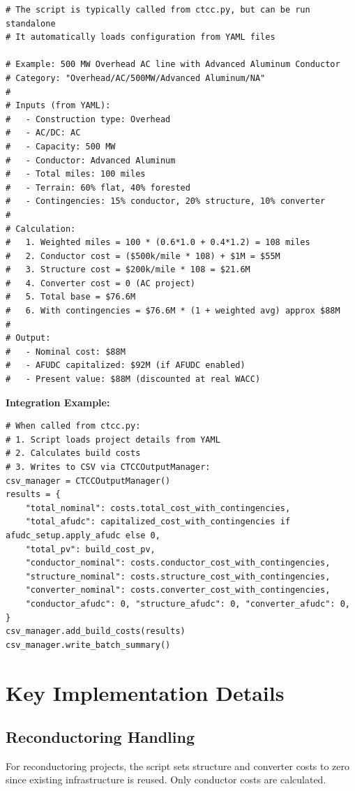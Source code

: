 \documentclass[ctcc_full_documentation.tex]{subfiles}
\begin{document}
\begin{lstlisting}
# The script is typically called from ctcc.py, but can be run standalone
# It automatically loads configuration from YAML files

# Example: 500 MW Overhead AC line with Advanced Aluminum Conductor
# Category: "Overhead/AC/500MW/Advanced Aluminum/NA"
# 
# Inputs (from YAML):
#   - Construction type: Overhead
#   - AC/DC: AC
#   - Capacity: 500 MW
#   - Conductor: Advanced Aluminum
#   - Total miles: 100 miles
#   - Terrain: 60% flat, 40% forested
#   - Contingencies: 15% conductor, 20% structure, 10% converter
#
# Calculation:
#   1. Weighted miles = 100 * (0.6*1.0 + 0.4*1.2) = 108 miles
#   2. Conductor cost = ($500k/mile * 108) + $1M = $55M
#   3. Structure cost = $200k/mile * 108 = $21.6M
#   4. Converter cost = 0 (AC project)
#   5. Total base = $76.6M
#   6. With contingencies = $76.6M * (1 + weighted avg) approx $88M
#
# Output:
#   - Nominal cost: $88M
#   - AFUDC capitalized: $92M (if AFUDC enabled)
#   - Present value: $88M (discounted at real WACC)
\end{lstlisting}

\textbf{Integration Example:}

\begin{lstlisting}
# When called from ctcc.py:
# 1. Script loads project details from YAML
# 2. Calculates build costs
# 3. Writes to CSV via CTCCOutputManager:
csv_manager = CTCCOutputManager()
results = {
    "total_nominal": costs.total_cost_with_contingencies,
    "total_afudc": capitalized_cost_with_contingencies if afudc_setup.apply_afudc else 0,
    "total_pv": build_cost_pv,
    "conductor_nominal": costs.conductor_cost_with_contingencies,
    "structure_nominal": costs.structure_cost_with_contingencies,
    "converter_nominal": costs.converter_cost_with_contingencies,
    "conductor_afudc": 0, "structure_afudc": 0, "converter_afudc": 0,
}
csv_manager.add_build_costs(results)
csv_manager.write_batch_summary()
\end{lstlisting}

\section{Key Implementation Details}

\subsection{Reconductoring Handling}

For reconductoring projects, the script sets structure and converter costs to zero since existing infrastructure is reused. Only conductor costs are calculated.
\end{document}
